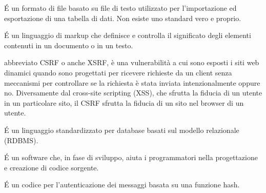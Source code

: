 \begin{acronym}
{\small \'E un formato di file basato su file di testo utilizzato per l'importazione ed esportazione di una tabella di dati. Non esiste uno standard vero e proprio. \par}
%

{\small \'E un linguaggio di markup che definisce e controlla il significato degli elementi contenuti in un documento o in un testo. \par}
%

{\small abbreviato CSRF o anche XSRF, è una vulnerabilità a cui sono esposti i siti web dinamici quando sono progettati per ricevere richieste da un client senza meccanismi per controllare se la richiesta è stata inviata intenzionalmente oppure no. Diversamente dal cross-site scripting (XSS), che sfrutta la fiducia di un utente in un particolare sito, il CSRF sfrutta la fiducia di un sito nel browser di un utente. \par}
%

{\small \'E un linguaggio standardizzato per database basati sul modello relazionale (RDBMS).  \par}
%

{\small \'E un software che, in fase di sviluppo, aiuta i programmatori nella progettazione e creazione di codice sorgente.  \par}
%
%

{\small \'E un codice per l'autenticazione dei messaggi basata su una funzione hash. \par}
\end{acronym}
